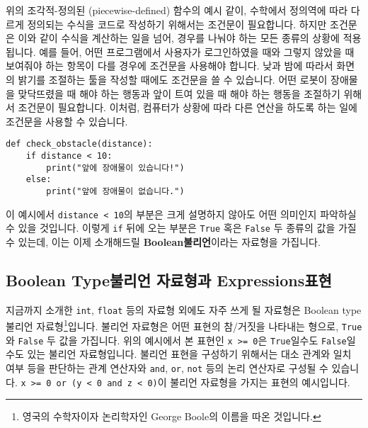 \documentclass[../main.tex]{subfiles}
\begin{document}
위의 조각적-정의된 (piecewise-defined) 함수의 예시 같이, 수학에서 정의역에 따라
다르게 정의되는 수식을 코드로 작성하기 위해서는 조건문이 필요합니다.
하지만 조건문은 이와 같이 수식을 계산하는 일을 넘어, 경우를 나눠야 하는 모든
종류의 상황에 적용됩니다.
예를 들어, 어떤 프로그램에서 사용자가 로그인하였을 때와 그렇지 않았을 때
보여줘야 하는 항목이 다를 경우에 조건문을 사용해야 합니다.
낮과 밤에 따라서 화면의 밝기를 조절하는 툴을 작성할 때에도 조건문을 쓸 수
있습니다.
어떤 로봇이 장애물을 맞닥뜨렸을 때 해야 하는 행동과 앞이 트여 있을 때 해야 하는
행동을 조절하기 위해서 조건문이 필요합니다.
이처럼, 컴퓨터가 상황에 따라 다른 연산을 하도록 하는 일에 조건문을 사용할 수
있습니다.
\begin{verbatim}
def check_obstacle(distance):
    if distance < 10:
        print("앞에 장애물이 있습니다!")
    else:
        print("앞에 장애물이 없습니다.")
\end{verbatim}

이 예시에서 \verb|distance < 10|의 부분은 크게 설명하지 않아도 어떤 의미인지
파악하실 수 있을 것입니다.
이렇게 \verb|if| 뒤에 오는 부분은 \verb|True| 혹은 \verb|False| 두 종류의 값을
가질 수 있는데, 이는 이제 소개해드릴 \textbf{Boolean불리언}이라는 자료형을
가집니다.

\subsection{Boolean Type불리언 자료형과 Expressions표현}
지금까지 소개한 \texttt{int}, \texttt{float} 등의 자료형 외에도 자주 쓰게 될
자료형은 Boolean type불리언 자료형\footnote{영국의 수학자이자 논리학자인 George
Boole의 이름을 따온 것입니다.}입니다.  불리언 자료형은 어떤 표현의 참/거짓을
나타내는 형으로, \texttt{True}와 \texttt{False} 두 값을 가집니다.  위의
예시에서 본 표현인 \texttt{x >= 0}은 \texttt{True}일수도 \texttt{False}일수도
있는 불리언 자료형입니다.  불리언 표현을 구성하기 위해서는 대소 관계와 일치
여부 등을 판단하는 관계 연산자와 \texttt{and}, \texttt{or}, \texttt{not} 등의
논리 연산자로 구성될 수 있습니다.  \texttt{x >= 0 or (y < 0 and z < 0)}이
불리언 자료형을 가지는 표현의 예시입니다.
\end{document}

